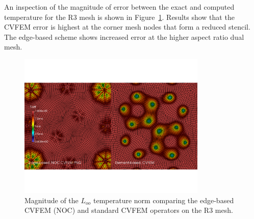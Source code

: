An inspection of the magnitude of error between the exact and computed temperature for the R3 mesh is shown in Figure~\ref{fig:tquadTdiff}.
Results show that the CVFEM error is highest at the corner mesh nodes that form a reduced stencil. The edge-based scheme shows increased error
at the higher aspect ratio dual mesh. 

\begin{figure}
\centerline{\includegraphics[width=0.8\textwidth]{figures/tquadEdgeCvfemTdiff.pdf}}
\caption{Magnitude of the $L_{oo}$ temperature norm comparing the edge-based CVFEM (NOC) and standard CVFEM operators on the R3 mesh.}
\label{fig:tquadTdiff}
\end{figure}
